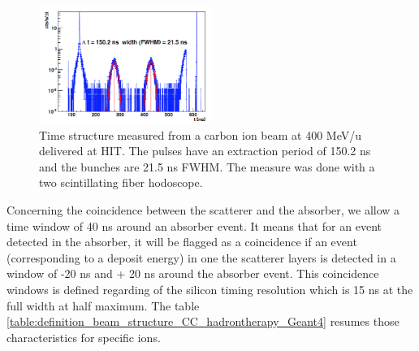 \documentclass[11pt]{iopart}
\begin{document}
	\begin{figure} [!hbtp]	
	\centering
	\includegraphics[width=0.5\textwidth]{./Figure/2013_Structure_Time_Beam_400MeV.png}
	\caption{Time structure measured from a carbon ion beam at 400 MeV/u delivered at HIT. The pulses have an extraction period of 150.2 ns and the bunches are 21.5 ns FWHM. The measure was done with a two scintillating fiber hodoscope.}
	\label{fig:fig_structure_temps_faisceau_HIT_2013_CC_simulation_Hadronth}
	\end{figure}


Concerning the coincidence between the scatterer and the absorber, we allow a time window of 40 ns around an absorber event. It means that for an event detected in the absorber, it will be flagged as a coincidence if an event (corresponding to a deposit energy) in one the scatterer layers is detected in a window of -20 ns and + 20 ns around the absorber event. This coincidence windows is defined regarding of the silicon timing resolution which is 15 ns at the full width at half maximum. The table \ref{table:definition_beam_structure_CC_hadrontherapy_Geant4} resumes those characteristics for specific ions.
\end{document}
